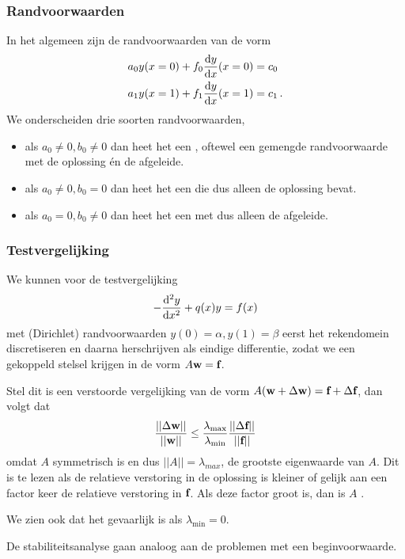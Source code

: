 \documentclass{2wn20summary}
\begin{document}
		 \subsubsection{Randvoorwaarden}
		 In het algemeen zijn de randvoorwaarden van de vorm
		 \begin{align*}
			 a_0 y(x=0) + f_0 \frac{\mathop{}\!\mathrm{d} y}{\mathop{}\!\mathrm{d} x} (x=0) &= c_0 \\
			 a_1 y(x=1) + f_1 \frac{\mathop{}\!\mathrm{d} y}{\mathop{}\!\mathrm{d} x} (x=1) &= c_1 \,.
		 \end{align*}
		 We onderscheiden drie soorten randvoorwaarden,
		 \begin{itemize}
		 	\item als $a_0 \neq 0, b_0 \neq 0$ dan heet het een , oftewel een gemengde randvoorwaarde met de oplossing \'en de afgeleide.
		 	\item als $a_0 \neq 0, b_0 = 0$ dan heet het een  die dus alleen de oplossing bevat.
		 	\item als $a_0 =0, b_0 \neq 0$ dan heet het een  met dus alleen de afgeleide.
		 \end{itemize}
		 
		 \subsubsection{Testvergelijking}
		 We kunnen voor de testvergelijking 
		 \[ 
			 - \frac{\mathop{}\!\mathrm{d}^2 y}{\mathop{}\!\mathrm{d} x^2} + q(x) y = f(x)
		  \]
		  met (Dirichlet) randvoorwaarden $y(0) = \alpha, y(1) =\beta$
		  eerst het rekendomein discretiseren en daarna herschrijven als eindige differentie, zodat we een gekoppeld stelsel krijgen in de vorm $A {\textbf{w}} = {\textbf{f}}$. 
		  
		  Stel dit is een verstoorde vergelijking van de vorm $A ({\textbf{w}} + \Delta {\textbf{w}} ) = {\textbf{f}} + \Delta {\textbf{f}} $, dan volgt dat
		  \[ 
			  \frac{|| \Delta {\textbf{w}} ||}{||{\textbf{w}} ||} \le \frac{\lambda_{\max}}{\lambda_{\min}} \frac{|| \Delta {\textbf{f}} ||}{|| {\textbf{f}} ||}
		   \] 
		   omdat $A$ symmetrisch is en dus $||A|| =\lambda_{max}$, de grootste eigenwaarde van $A$. Dit is te lezen als de relatieve verstoring in de oplossing is kleiner of gelijk aan een factor keer de relatieve verstoring in ${\textbf{f}} $. Als deze factor groot is, dan is $A$ .
		   
		   We zien ook dat het gevaarlijk is als $\lambda_{\min}=0$.
		   
		   De stabiliteitsanalyse gaan analoog aan de problemen met een beginvoorwaarde.
		   
\end{document}
